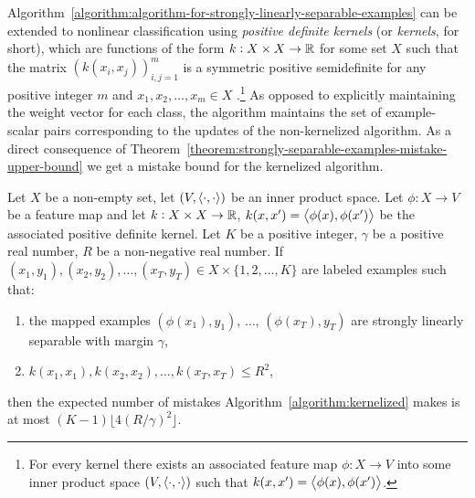 Algorithm~\ref{algorithm:algorithm-for-strongly-linearly-separable-examples} can
be extended to nonlinear classification using \emph{positive definite kernels}
(or \emph{kernels}, for short), which are functions of the form $k: X \times X
\to \mathbb{R}$ for some set $X$ such that the matrix
$\left(k(x_i,x_j)\right)_{i,j=1}^m$ is a symmetric positive semidefinite for any
positive integer $m$ and $x_1, x_2, \dots, x_m \in X$ \citep[Definition
2.5]{Scholkopf-Smola-2002}.\footnote{For every kernel there exists an associated feature map
$\phi:X \to V$ into some inner product space $(V,\left\langle \cdot, \cdot \right\rangle)$ such that
$k(x,x') = \left\langle \phi(x), \phi(x') \right\rangle$.} As opposed to explicitly maintaining the
weight vector for each class, the algorithm maintains the set of example-scalar
pairs corresponding to the updates of the non-kernelized algorithm. As a direct
consequence of
Theorem~\ref{theorem:strongly-separable-examples-mistake-upper-bound} we get a
mistake bound for the kernelized algorithm.

\begin{theorem}
\label{theorem:kernelized-upper-bound}
Let $X$ be a non-empty set, let $(V, \left\langle \cdot, \cdot \right\rangle)$ be an inner product
space. Let $\phi:X \to V$ be a feature map and let $k:X \times X \to \mathbb{R}$,
$k(x,x') = \left\langle \phi(x), \phi(x') \right\rangle$ be the associated positive definite
kernel. Let $K$ be a positive integer, $\gamma$ be a positive real number, $R$
be a non-negative real number. If $(x_1, y_1), (x_2, y_2), \dots, (x_T, y_T) \in
X \times \{1,2,\dots,K\}$ are labeled examples such that:
\begin{enumerate}
\item the mapped examples $(\phi(x_1), y_1)$, $\dots$, $(\phi(x_T), y_T)$
are strongly linearly separable with margin $\gamma$,
\item $k(x_1, x_1), k(x_2, x_2), \dots, k(x_T,x_T) \le R^2$,
\end{enumerate}
then the expected number of mistakes Algorithm~\ref{algorithm:kernelized} makes
is at most $(K-1) \lfloor 4(R/\gamma)^2 \rfloor$.
\end{theorem}

